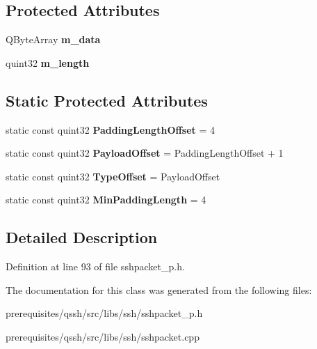 \subsection*{Protected Attributes}
\begin{DoxyCompactItemize}
\item 
\mbox{\label{class_q_ssh_1_1_internal_1_1_abstract_ssh_packet_a7858227e5e931ea94e69a4b9876e2328}} 
Q\+Byte\+Array {\bfseries m\+\_\+data}
\item 
\mbox{\label{class_q_ssh_1_1_internal_1_1_abstract_ssh_packet_a0736ecffc550c00098c0007c33301137}} 
quint32 {\bfseries m\+\_\+length}
\end{DoxyCompactItemize}
\subsection*{Static Protected Attributes}
\begin{DoxyCompactItemize}
\item 
\mbox{\label{class_q_ssh_1_1_internal_1_1_abstract_ssh_packet_a1cbab3cc3b4efad3ad203066de017ef8}} 
static const quint32 {\bfseries Padding\+Length\+Offset} = 4
\item 
\mbox{\label{class_q_ssh_1_1_internal_1_1_abstract_ssh_packet_acba2969b09b8756723c3679568c5ae57}} 
static const quint32 {\bfseries Payload\+Offset} = Padding\+Length\+Offset + 1
\item 
\mbox{\label{class_q_ssh_1_1_internal_1_1_abstract_ssh_packet_a5d24dc506b1ed3c5ea45dca2739f1e26}} 
static const quint32 {\bfseries Type\+Offset} = Payload\+Offset
\item 
\mbox{\label{class_q_ssh_1_1_internal_1_1_abstract_ssh_packet_a7dbdf1f0b8f522c26c0237188db24b75}} 
static const quint32 {\bfseries Min\+Padding\+Length} = 4
\end{DoxyCompactItemize}


\subsection{Detailed Description}


Definition at line 93 of file sshpacket\+\_\+p.\+h.



The documentation for this class was generated from the following files\+:\begin{DoxyCompactItemize}
\item 
prerequisites/qssh/src/libs/ssh/sshpacket\+\_\+p.\+h\item 
prerequisites/qssh/src/libs/ssh/sshpacket.\+cpp\end{DoxyCompactItemize}

